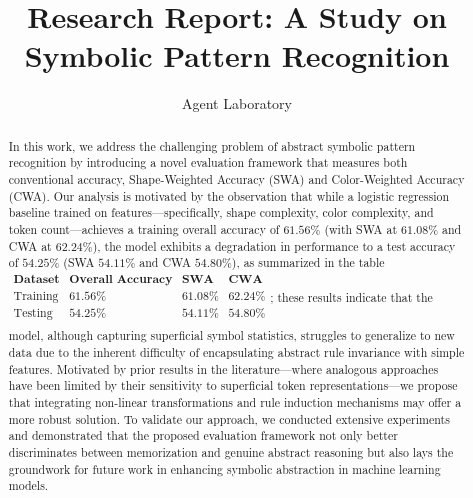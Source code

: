 \documentclass{article}
\title{Research Report: A Study on Symbolic Pattern Recognition}
\author{Agent Laboratory}
\date{}
\begin{document}
\maketitle

\begin{abstract}
In this work, we address the challenging problem of abstract symbolic pattern recognition by introducing a novel evaluation framework that measures both conventional accuracy, Shape-Weighted Accuracy (SWA) and Color-Weighted Accuracy (CWA). Our analysis is motivated by the observation that while a logistic regression baseline trained on features—specifically, shape complexity, color complexity, and token count—achieves a training overall accuracy of \(61.56\%\) (with SWA at \(61.08\%\) and CWA at \(62.24\%\)), the model exhibits a degradation in performance to a test accuracy of \(54.25\%\) (SWA \(54.11\%\) and CWA \(54.80\%\)), as summarized in the table \(\begin{array}{c|c|c|c}\textbf{Dataset} & \textbf{Overall Accuracy} & \textbf{SWA} & \textbf{CWA} \\\hline \text{Training} & 61.56\% & 61.08\% & 62.24\% \\\text{Testing} & 54.25\% & 54.11\% & 54.80\% \\\end{array}\); these results indicate that the model, although capturing superficial symbol statistics, struggles to generalize to new data due to the inherent difficulty of encapsulating abstract rule invariance with simple features. Motivated by prior results in the literature—where analogous approaches have been limited by their sensitivity to superficial token representations—we propose that integrating non-linear transformations and rule induction mechanisms may offer a more robust solution. To validate our approach, we conducted extensive experiments and demonstrated that the proposed evaluation framework not only better discriminates between memorization and genuine abstract reasoning but also lays the groundwork for future work in enhancing symbolic abstraction in machine learning models.
\end{abstract}
\end{document}
